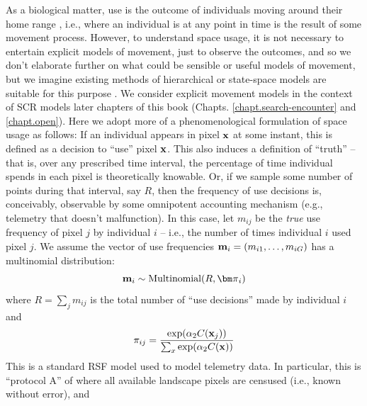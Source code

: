 As a biological matter, use is the outcome of individuals moving
around their home range \citep{hooten_etal:2010}, i.e., where an
individual is at any point in time is the result of some movement
process. However, to understand space usage, it is not necessary to
entertain explicit models of movement, just to observe the outcomes,
and so we don't elaborate further on what could be sensible or useful
models of movement, but we imagine existing methods of hierarchical or
state-space models are suitable for this purpose
\citep{ovaskainen:2004, jonsen_etal:2005, forester_etal:2007,
  ovaskainen_etal:2008, patterson_etal:2008, hooten_etal:2010,
  mcclintock_etal:2012}.  We consider explicit movement models in the
context of SCR models later chapters of this book
(Chapts. \ref{chapt.search-encounter} and \ref{chapt.open}).  Here we
adopt more of a phenomenological formulation of space usage as
follows: If an individual appears in pixel ${\bf x}$ at some instant,  
this is defined as a decision to ``use'' pixel ${\bf
  x}$. 
This also induces a definition of ``truth'' -- that is, over
any prescribed time interval, the percentage of time individual spends
in each pixel is theoretically knowable. Or, if we sample some number
of points during that interval, say $R$, 
then the frequency of use decisions is,
 conceivably, observable by some
omnipotent accounting mechanism (e.g., telemetry that doesn't malfunction).
In this
case, let $m_{ij}$ be the {\it true} use frequency of pixel $j$ by
individual $i$ -- i.e., the number of times individual $i$ used pixel
$j$.  We assume the vector of use frequencies ${\bf m}_{i} =
(m_{i1},\ldots,m_{iG})$ has a multinomial distribution:
\[
{\bf m}_{i} \sim \mbox{Multinomial}(R, {\bm \pi}_{i})
\]
where $R = \sum_{j} m_{ij}$ is the total number of ``use decisions''
made by individual $i$ and
\[
 \pi_{ij} = \frac{ \exp( \alpha_{2} C({\bf x}_{j}) ) }{ \sum_{x}
   \exp(\alpha_{2} C({\bf x}))}
\]
This is a standard RSF model \citep{manly_etal:2002} used to model
telemetry data. In particular, this is ``protocol A'' of
\citep{manly_etal:2002} where all available landscape pixels are censused (i.e., known without error), and
